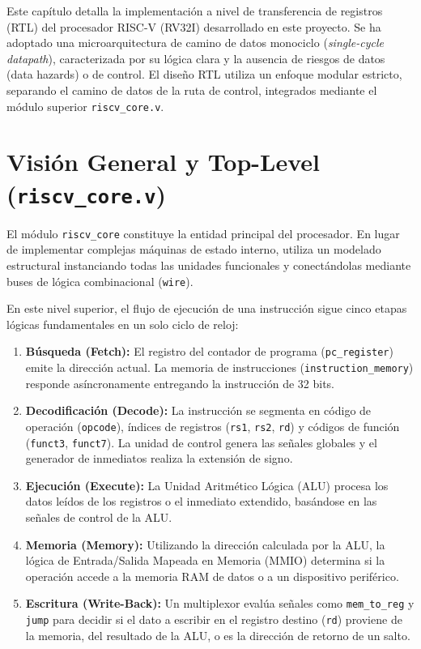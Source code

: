 Este capítulo detalla la implementación a nivel de transferencia de registros (RTL) del procesador RISC-V (RV32I) desarrollado en este proyecto. Se ha adoptado una microarquitectura de camino de datos monociclo (\textit{single-cycle datapath}), caracterizada por su lógica clara y la ausencia de riesgos de datos (data hazards) o de control. El diseño RTL utiliza un enfoque modular estricto, separando el camino de datos de la ruta de control, integrados mediante el módulo superior \texttt{riscv\_core.v}.

\section{Visión General y Top-Level (\texttt{riscv\_core.v})}
\label{sec:TopLevel}

El módulo \texttt{riscv\_core} constituye la entidad principal del procesador. En lugar de implementar complejas máquinas de estado interno, utiliza un modelado estructural instanciando todas las unidades funcionales y conectándolas mediante buses de lógica combinacional (\texttt{wire}).



En este nivel superior, el flujo de ejecución de una instrucción sigue cinco etapas lógicas fundamentales en un solo ciclo de reloj:
\begin{enumerate}
    \item \textbf{Búsqueda (Fetch):} El registro del contador de programa (\texttt{pc\_register}) emite la dirección actual. La memoria de instrucciones (\texttt{instruction\_memory}) responde asíncronamente entregando la instrucción de 32 bits.
    \item \textbf{Decodificación (Decode):} La instrucción se segmenta en código de operación (\texttt{opcode}), índices de registros (\texttt{rs1}, \texttt{rs2}, \texttt{rd}) y códigos de función (\texttt{funct3}, \texttt{funct7}). La unidad de control genera las señales globales y el generador de inmediatos realiza la extensión de signo.
    \item \textbf{Ejecución (Execute):} La Unidad Aritmético Lógica (ALU) procesa los datos leídos de los registros o el inmediato extendido, basándose en las señales de control de la ALU.
    \item \textbf{Memoria (Memory):} Utilizando la dirección calculada por la ALU, la lógica de Entrada/Salida Mapeada en Memoria (MMIO) determina si la operación accede a la memoria RAM de datos o a un dispositivo periférico.
    \item \textbf{Escritura (Write-Back):} Un multiplexor evalúa señales como \texttt{mem\_to\_reg} y \texttt{jump} para decidir si el dato a escribir en el registro destino (\texttt{rd}) proviene de la memoria, del resultado de la ALU, o es la dirección de retorno de un salto.
\end{enumerate}

